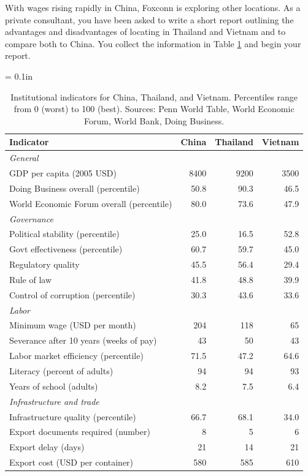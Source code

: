 \documentclass[letterpaper,12pt]{exam}
\begin{document}
\begin{questions}
With wages rising rapidly in China, Foxconn is exploring other locations.
As a private consultant, you have been asked to write a short report
outlining the advantages and disadvantages of locating in Thailand and Vietnam
and to compare both to China.
You collect the information in Table \ref{tab:ctv} and begin your report.

\begin{table}[h]
\centering
\tabcolsep = 0.1in
\begin{tabular}{lrrr}
\toprule
Indicator & China & Thailand & Vietnam \\
\midrule
\multicolumn{2}{l}{\it General} \\
GDP per capita  (2005 USD) &  8400 & 9200 & 3500  \\
Doing Business overall (percentile) & 50.8  &90.3 & 46.5 \\
World Economic Forum overall (percentile) & 80.0 & 73.6 & 47.9\\
\midrule
\multicolumn{2}{l}{\it Governance} \\
Political stability (percentile)  &  25.0 & 16.5 & 52.8 \\
Govt effectiveness (percentile)   &  60.7 & 59.7 & 45.0 \\
Regulatory quality                & 45.5  & 56.4 & 29.4\\
Rule of law                       & 41.8 & 48.8 & 39.9 \\
Control of corruption (percentile) & 30.3 & 43.6 & 33.6  \\
\midrule
\multicolumn{2}{l}{\it Labor} \\
Minimum wage (USD per month) &  204 & 118 & 65 \\
Severance after 10 years (weeks of pay) & 43 & 50 & 43 \\
Labor market efficiency (percentile) & 71.5 & 47.2 & 64.6 \\
Literacy (percent of adults)        & 94 & 94 & 93 \\
Years of school (adults)        & 8.2 & 7.5 & 6.4 \\
\midrule
\multicolumn{2}{l}{\it Infrastructure and trade} \\
Infrastructure quality (percentile)  & 66.7 & 68.1 & 34.0 \\
Export documents required (number) & 8 & 5 & 6\\
Export delay (days) &  21 & 14 & 21  \\
Export cost (USD per container) &  580 & 585 & 610 \\
\bottomrule
\end{tabular}
\caption{Institutional indicators for China, Thailand, and Vietnam.
Percentiles range from 0 (worst) to 100 (best).
Sources:  Penn World Table, World Economic Forum, World Bank, Doing Business.}
\label{tab:ctv}
\end{table}



\end{questions}
\end{document}

